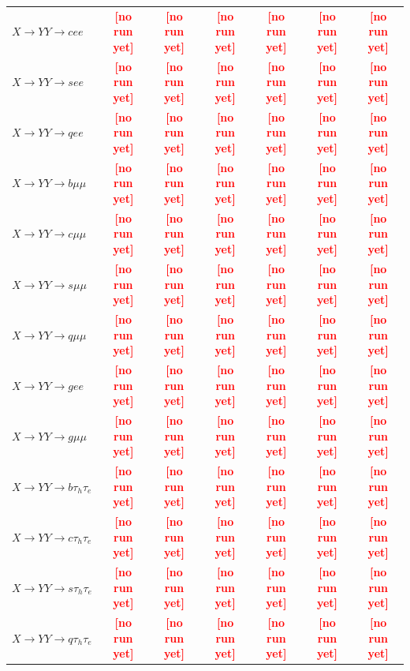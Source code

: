 \documentclass[12pt]{article}   %
\newcommand{\pending}[1]{\textcolor{red}{\textbf{[#1]}}}
\begin{document}
\begin{landscape}
{\begin{longtable}{@{\extracolsep{\fill}}lcccccc@{}}
$X\to YY\to cee$ & \pending{no run yet} & \pending{no run yet} & \pending{no run yet} & \pending{no run yet} & \pending{no run yet} & \pending{no run yet} \\
$X\to YY\to see$ & \pending{no run yet} & \pending{no run yet} & \pending{no run yet} & \pending{no run yet} & \pending{no run yet} & \pending{no run yet} \\
$X\to YY\to qee$ & \pending{no run yet} & \pending{no run yet} & \pending{no run yet} & \pending{no run yet} & \pending{no run yet} & \pending{no run yet} \\
$X\to YY\to b\mu\mu$ & \pending{no run yet} & \pending{no run yet} & \pending{no run yet} & \pending{no run yet} & \pending{no run yet} & \pending{no run yet} \\
$X\to YY\to c\mu\mu$ & \pending{no run yet} & \pending{no run yet} & \pending{no run yet} & \pending{no run yet} & \pending{no run yet} & \pending{no run yet} \\
$X\to YY\to s\mu\mu$ & \pending{no run yet} & \pending{no run yet} & \pending{no run yet} & \pending{no run yet} & \pending{no run yet} & \pending{no run yet} \\
$X\to YY\to q\mu\mu$ & \pending{no run yet} & \pending{no run yet} & \pending{no run yet} & \pending{no run yet} & \pending{no run yet} & \pending{no run yet} \\
$X\to YY\to gee$ & \pending{no run yet} & \pending{no run yet} & \pending{no run yet} & \pending{no run yet} & \pending{no run yet} & \pending{no run yet} \\
$X\to YY\to g\mu\mu$ & \pending{no run yet} & \pending{no run yet} & \pending{no run yet} & \pending{no run yet} & \pending{no run yet} & \pending{no run yet} \\
\midrule
$X\to YY\to b\tau_h\tau_e$ & \pending{no run yet} & \pending{no run yet} & \pending{no run yet} & \pending{no run yet} & \pending{no run yet} & \pending{no run yet} \\
$X\to YY\to c\tau_h\tau_e$ & \pending{no run yet} & \pending{no run yet} & \pending{no run yet} & \pending{no run yet} & \pending{no run yet} & \pending{no run yet} \\
$X\to YY\to s\tau_h\tau_e$ & \pending{no run yet} & \pending{no run yet} & \pending{no run yet} & \pending{no run yet} & \pending{no run yet} & \pending{no run yet} \\
$X\to YY\to q\tau_h\tau_e$ & \pending{no run yet} & \pending{no run yet} & \pending{no run yet} & \pending{no run yet} & \pending{no run yet} & \pending{no run yet} \\

\end{longtable}}
\end{landscape}
\end{document}
